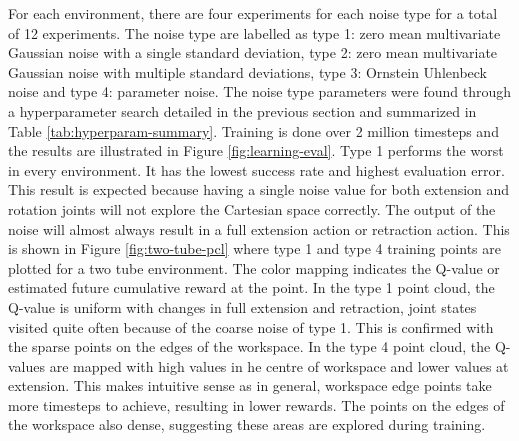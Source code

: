 For each environment, there are four experiments for each noise type for a total of 12 experiments. The noise type are labelled as  type 1: zero mean multivariate Gaussian noise with a single standard deviation, type 2: zero mean multivariate Gaussian noise with multiple standard deviations, type 3: Ornstein Uhlenbeck noise and type 4: parameter noise. The noise type parameters were found through a hyperparameter search detailed in the previous section and summarized in Table \ref{tab:hyperparam-summary}. Training is done over 2 million timesteps and the results are illustrated in Figure \ref{fig:learning-eval}. Type 1 performs the worst in every environment. It has the lowest success rate and highest evaluation error. This result is expected because having a single noise value for both extension and rotation joints will not explore the Cartesian space correctly. The output of the noise will almost always result in a full extension action or retraction action. This is shown in Figure \ref{fig:two-tube-pcl} where type 1 and type 4 training points are plotted for a two tube environment. The color mapping indicates the Q-value or estimated future cumulative reward at the point. In the type 1 point cloud, the Q-value is uniform with changes in full extension and retraction, joint states visited quite often because of the coarse noise of type 1. This is confirmed with the sparse points on the edges of the workspace. In the type 4 point cloud, the Q-values are mapped with high values in he centre of workspace and lower values at extension. This makes intuitive sense as in general, workspace edge points take more timesteps to achieve, resulting in lower rewards. The points on the edges of the workspace also dense, suggesting these areas are explored during training.

